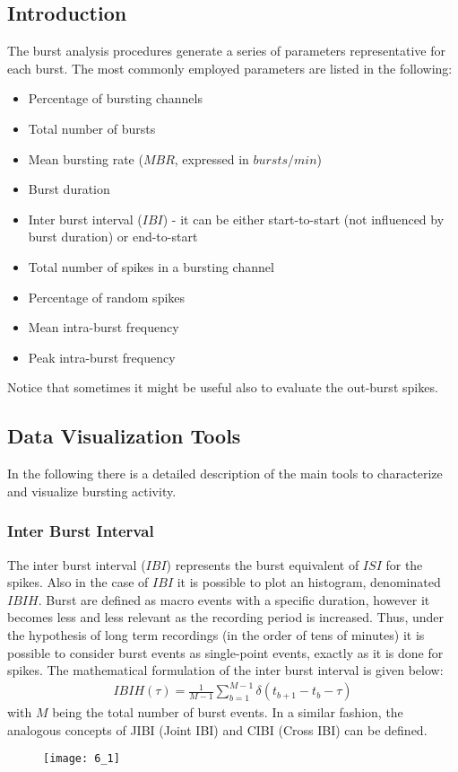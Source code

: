 \subsection{Introduction}
The burst analysis procedures generate a series of parameters representative for
each burst. The most commonly employed parameters are listed in the following:
\begin{itemize}
    \item Percentage of bursting channels
    \item Total number of bursts
    \item Mean bursting rate (\(MBR\), expressed in \(bursts/min\))
    \item Burst duration
    \item Inter burst interval (\(IBI\)) - it can be either start-to-start (not
          influenced by burst duration) or end-to-start
    \item Total number of spikes in a bursting channel
    \item Percentage of random spikes
    \item Mean intra-burst frequency
    \item Peak intra-burst frequency
\end{itemize}
Notice that sometimes it might be useful also to evaluate the out-burst spikes.

\subsection{Data Visualization Tools}
In the following there is a detailed description of the main tools to characterize and
visualize bursting activity.

\subsubsection{Inter Burst Interval}
The inter burst interval (\(IBI\)) represents the burst equivalent of \(ISI\) for
the spikes. Also in the case of \(IBI\) it is possible to plot an histogram,
denominated \(IBIH\). Burst are defined as macro events with a specific duration,
however it becomes less and less relevant as the recording period is increased.
Thus, under the hypothesis of long term recordings (in the order of tens of minutes)
it is possible to consider burst events as single-point events, exactly as it is done
for spikes. The mathematical formulation of the inter burst interval is given below:
\begin{align*}
    IBIH(\tau)=\frac{1}{M-1}\sum_{b=1}^{M-1}\delta(t_{b+1}-t_{b}-\tau)
\end{align*}
with \(M\) being the total number of burst events.
In a similar fashion, the analogous concepts of JIBI (Joint IBI) and CIBI (Cross IBI)
can be defined.
\begin{figure}[H]
    \texttt{[image: 6\_1]}
    \centering
\end{figure}

